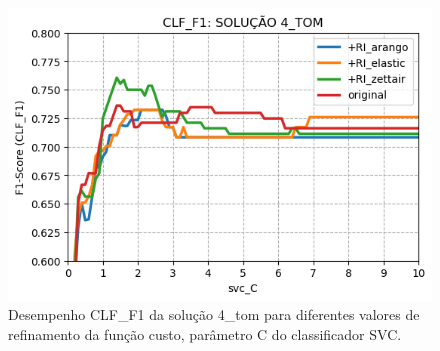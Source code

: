 \begin{figure}[h]
    \centering
    \caption{Desempenho CLF\_F1 da solução 4\_tom para diferentes valores de refinamento da função custo, parâmetro C do classificador SVC.}
    \vspace{-0.5cm}
    \begin{center}
        \includegraphics[scale=0.75]{img/clf-f1-4-tom.png}
    \end{center}
    \vspace{-0.5cm}
    \label{fig:clf-f1-4-tom}
\end{figure}